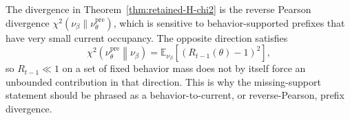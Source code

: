 \begin{remark}
\label{rem:chi2-direction}
The divergence in Theorem~\ref{thm:retained-H-chi2} is the reverse Pearson
divergence \(\chi^2(\nu_\beta\|\nu_\theta^{\mathrm{pre}})\), which is sensitive
to behavior-supported prefixes that have very small current occupancy. The
opposite direction satisfies
\[
    \chi^2\!\left(\nu_\theta^{\mathrm{pre}}\middle\|\nu_\beta\right)
    =
    \mathbb E_{\nu_\beta}
    \left[
        \left(R_{t-1}(\theta)-1\right)^2
    \right],
\]
so \(R_{t-1}\ll 1\) on a set of fixed behavior mass does not by itself force an
unbounded contribution in that direction. This is why the missing-support
statement should be phrased as a behavior-to-current, or reverse-Pearson,
prefix divergence.
\end{remark}